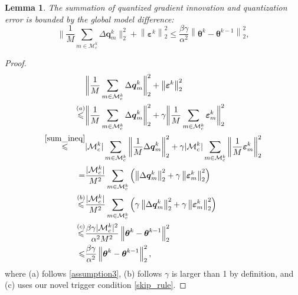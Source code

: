 \documentclass[lettersize,journal]{IEEEtran}
\newtheorem{lemma}{Lemma}
\begin{document}
\begin{lemma}
\label{Lemma3}
    \textit{The summation of quantized gradient innovation and quantization error is bounded by the global model difference:
\begin{equation}
    \bigg\|\frac{1}{M}\sum_{m \in \mathcal{M}_c^k} \Delta \boldsymbol{q}_{m}^{k}\bigg\|_2^2+\left\| \boldsymbol{\varepsilon}^k \right\|_2^2 \leqslant \frac{\beta\gamma}{\alpha^2}\left\|\boldsymbol{\theta}^{k}-\boldsymbol{\theta}^{k-1}\right\|_2^2,
    \label{error_phi}
\end{equation}}\end{lemma}
\begin{proof}\begin{equation}\begin{aligned}
&\bigg\|\frac{1}{M}\sum_{m \in \mathcal{M}_c^k} \Delta \boldsymbol{q}_{m}^{k}\bigg\|_2^2+\left\| \boldsymbol{\varepsilon}^k \right\|_2^2\\
\overset{(a)}{\leqslant} &\bigg\|\frac{1}{M}\sum_{m \in \mathcal{M}_c^k} \Delta \boldsymbol{q}_{m}^{k}\bigg\|_2^2+\gamma\bigg\|\frac{1}{M}\sum_{m \in \mathcal{M}_c^k} \boldsymbol{\varepsilon}_m^k\bigg\|_2^2 \\
\overset{\eqref{sum_ineq}}{\leqslant} &|\mathcal{M}_c^k|\sum_{m \in \mathcal{M}_c^k}\bigg\|\frac{1}{M} \Delta \boldsymbol{q}_{m}^{k}\bigg\|_2^2+\gamma |\mathcal{M}_c^k| \sum_{m \in \mathcal{M}_c^k}\bigg\| \frac{1}{M}\boldsymbol{\varepsilon}_m^k\bigg\|_2^2 \\
{=} &\frac{|\mathcal{M}_c^k| }{M^2}\sum_{m \in \mathcal{M}_c^k}\left(\left\|\Delta \boldsymbol{q}_{m}^{k}\right\|_2^2+\gamma\left\|\boldsymbol{\varepsilon}_m^k\right\|_2^2\right)\\
\overset{(b)}{\leqslant} & \frac{|\mathcal{M}_c^k| }{M^2}\sum_{m \in \mathcal{M}_c^k}\left(\gamma \left\|\Delta \boldsymbol{q}_{m}^{k}\right\|_2^2+\gamma\left\|\boldsymbol{\varepsilon}_m^k\right\|_2^2\right)\\
\overset{(c)}{\leqslant} & \frac{\beta\gamma|\mathcal{M}_c^k|^2}{\alpha^2 M^2}\left\|\boldsymbol{\theta}^{k}-\boldsymbol{\theta}^{k-1}\right\|_2^2 \\
\leqslant & \frac{\beta\gamma}{\alpha^2}\left\|\boldsymbol{\theta}^{k}-\boldsymbol{\theta}^{k-1}\right\|_2^2,
\end{aligned}
\end{equation}
where (a) follows \cref{assumption3}, (b) follows $\gamma$ is larger than 1 by definition, and (c) uses our novel trigger condition \eqref{skip_rule}.
\end{proof}
\end{document}
